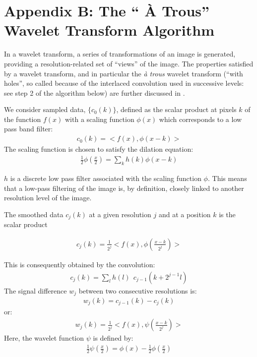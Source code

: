\section*{Appendix B: The `` \`A Trous'' Wavelet Transform Algorithm}

In a wavelet transform, a series of transformations of an image is 
generated, providing a resolution-related set of  ``views'' of the image.  
The properties satisfied by a wavelet transform, and in particular the
{\it \`a trous} wavelet transform (``with holes'', so called because of the 
interlaced
convolution used in successive levels: see step 2 of the algorithm below) 
are further discussed in \cite{starck:book98}. 

We consider sampled data, 
$\{c_0(k)\}$, defined as  the scalar product at 
pixels $k$ of the function $f(x)$ with a scaling function $\phi(x)$
which corresponds to a low pass band filter:
\begin{eqnarray}
c_0(k) = < f(x), \phi(x-k)>
\end{eqnarray}
The scaling function is chosen to satisfy the dilation equation:
\begin{eqnarray}
\frac{1}{2}\phi(\frac{x}{2}) = \sum_k h(k)\phi(x-k)
\end{eqnarray}
 
$h$ is a discrete low pass filter associated with the scaling function
$\phi$.  This means that a low-pass filtering
of the image is, by definition, closely linked to another resolution level
of the image.   
 
The smoothed data $c_j(k)$ at a given resolution $j$ and at a position
$k$  is the scalar product 
 
\begin{eqnarray}
c_j(k)= \frac{1}{2^j}< f(x), \phi(\frac{x-k}{2^j})>
\end{eqnarray}
 
This is consequently obtained by the convolution:
\begin{eqnarray}
c_j(k) = \sum_l h(l) \ \ c_{j-1} (k+2^{j-1}l)
\end{eqnarray}
The signal difference $w_j$ between two consecutive resolutions is:
\begin{eqnarray}
w_j(k) = c_{j-1}(k) - c_j(k) 
\end{eqnarray}
or:
\begin{eqnarray}
w_j(k) = \frac{1}{2^j}< f(x), \psi(\frac{x-k}{2^j})>  
\end{eqnarray}
Here, the wavelet function $\psi$ is defined by:
\begin{eqnarray}
\frac{1}{2}\psi(\frac{x}{2})  = \phi(x) - \frac{1}{2}\phi(\frac{x}{2})
\end{eqnarray}
 
